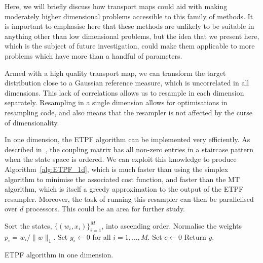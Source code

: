 \documentclass[final]{siamltex}
\begin{document}
Here, we will briefly discuss how transport maps could aid
with making moderately higher dimensional problems accessible to this
family of methods. It is important to emphasise here that these
methods are unlikely to be suitable in anything other than low
dimensional problems, but the idea that we present here, which is the
subject of future investigation, could make them applicable to more
problems which have more than a handful of parameters.

Armed with a high quality transport map, we can transform the target
distribution close to a Gaussian reference measure, which is
uncorrelated in all dimensions. This lack of correlations allows us to
resample in each dimension separately. Resampling in a
single dimension allows for optimisations in resampling code, and also
means that the resampler is not affected by the curse of
dimensionality. 

In one
dimension, the ETPF algorithm can be implemented very efficiently. As
described in~\cite{reich2013nonparametric}, the coupling matrix has
all non-zero entries in a staircase pattern when the state space is
ordered. We can exploit this knowledge to produce
Algorithm~\ref{alg:ETPF_1d}, which is much faster than using the
simplex algorithm to minimise the associated cost function, and faster
than the MT algorithm\cite{cotter2015parallel}, which is itself a
greedy approximation to the output of the ETPF resampler. Moreover, the task of
running this resampler can then be parallelised over $d$
processors. This could be an area for further study.

\begin{table}[!htpb]
\begin{algorithm}[H]
\DontPrintSemicolon
\BlankLine
Sort the states, $\{(w_i, x_i)\}_{i=1}^M$, into ascending order.\;
Normalise the weights $p_i = w_i/\|w\|_1$.\;
Set $y_i \leftarrow 0$ for all $i=1,\dots,M$.\;
Set $c \leftarrow 0$\;
Return $y$.\;
\caption{ETPF algorithm in one dimension.\label{alg:ETPF_1d}}
\end{algorithm}
\end{table}
\end{document}
